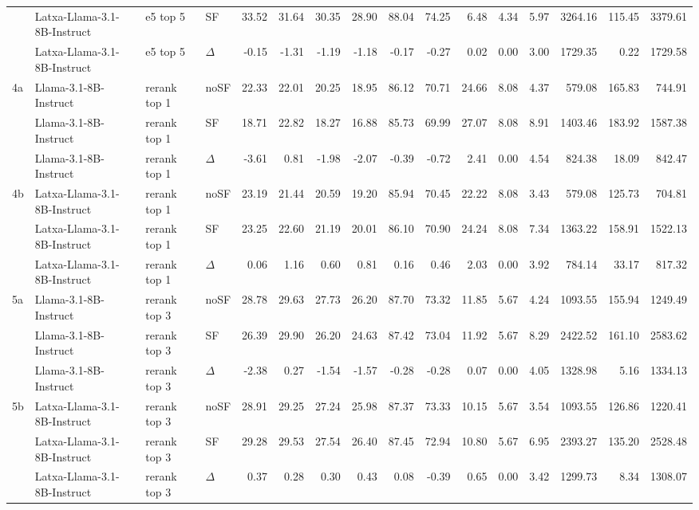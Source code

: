 \begin{landscape}
\begin{footnotesize}
\begin{longtable}{l l l l r r r r r r r r r r r r}
 & Latxa-Llama-3.1-8B-Instruct & e5 top 5 & SF & 33.52 & 31.64 & 30.35 & 28.90 & 88.04 & 74.25 & 6.48 & 4.34 & 5.97 & 3264.16 & 115.45 & 3379.61 \\
 & Latxa-Llama-3.1-8B-Instruct & e5 top 5 & $\Delta$ & -0.15 & -1.31 & -1.19 & -1.18 & -0.17 & -0.27 & 0.02 & 0.00 & 3.00 & 1729.35 & 0.22 & 1729.58 \\
\midrule
4a & Llama-3.1-8B-Instruct & rerank top 1 & noSF & 22.33 & 22.01 & 20.25 & 18.95 & 86.12 & 70.71 & 24.66 & 8.08 & 4.37 & 579.08 & 165.83 & 744.91 \\
 & Llama-3.1-8B-Instruct & rerank top 1 & SF & 18.71 & 22.82 & 18.27 & 16.88 & 85.73 & 69.99 & 27.07 & 8.08 & 8.91 & 1403.46 & 183.92 & 1587.38 \\
 & Llama-3.1-8B-Instruct & rerank top 1 & $\Delta$ & -3.61 & 0.81 & -1.98 & -2.07 & -0.39 & -0.72 & 2.41 & 0.00 & 4.54 & 824.38 & 18.09 & 842.47 \\
4b & Latxa-Llama-3.1-8B-Instruct & rerank top 1 & noSF & 23.19 & 21.44 & 20.59 & 19.20 & 85.94 & 70.45 & 22.22 & 8.08 & 3.43 & 579.08 & 125.73 & 704.81 \\
 & Latxa-Llama-3.1-8B-Instruct & rerank top 1 & SF & 23.25 & 22.60 & 21.19 & 20.01 & 86.10 & 70.90 & 24.24 & 8.08 & 7.34 & 1363.22 & 158.91 & 1522.13 \\
 & Latxa-Llama-3.1-8B-Instruct & rerank top 1 & $\Delta$ & 0.06 & 1.16 & 0.60 & 0.81 & 0.16 & 0.46 & 2.03 & 0.00 & 3.92 & 784.14 & 33.17 & 817.32 \\
\midrule
5a & Llama-3.1-8B-Instruct & rerank top 3 & noSF & 28.78 & 29.63 & 27.73 & 26.20 & 87.70 & 73.32 & 11.85 & 5.67 & 4.24 & 1093.55 & 155.94 & 1249.49 \\
 & Llama-3.1-8B-Instruct & rerank top 3 & SF & 26.39 & 29.90 & 26.20 & 24.63 & 87.42 & 73.04 & 11.92 & 5.67 & 8.29 & 2422.52 & 161.10 & 2583.62 \\
 & Llama-3.1-8B-Instruct & rerank top 3 & $\Delta$ & -2.38 & 0.27 & -1.54 & -1.57 & -0.28 & -0.28 & 0.07 & 0.00 & 4.05 & 1328.98 & 5.16 & 1334.13 \\
5b & Latxa-Llama-3.1-8B-Instruct & rerank top 3 & noSF & 28.91 & 29.25 & 27.24 & 25.98 & 87.37 & 73.33 & 10.15 & 5.67 & 3.54 & 1093.55 & 126.86 & 1220.41 \\
 & Latxa-Llama-3.1-8B-Instruct & rerank top 3 & SF & 29.28 & 29.53 & 27.54 & 26.40 & 87.45 & 72.94 & 10.80 & 5.67 & 6.95 & 2393.27 & 135.20 & 2528.48 \\
 & Latxa-Llama-3.1-8B-Instruct & rerank top 3 & $\Delta$ & 0.37 & 0.28 & 0.30 & 0.43 & 0.08 & -0.39 & 0.65 & 0.00 & 3.42 & 1299.73 & 8.34 & 1308.07 \\

\end{longtable}
\end{footnotesize}
\end{landscape}
